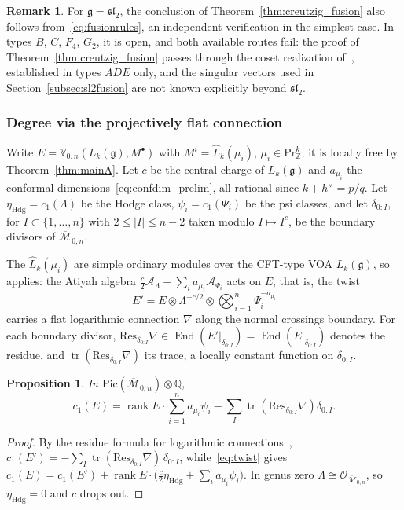 \documentclass[12pt,a4paper,reqno]{amsart}
\numberwithin{equation}{section}
\newtheorem{proposition}[theorem]{Proposition}
\theoremstyle{definition}
\newtheorem{remark}[theorem]{Remark}
\newcommand{\g}{\mathfrak{g}}
\renewcommand{\sl}{\mathfrak{sl}}
\newcommand{\rk}{\operatorname{rank}}
\newcommand{\End}{\operatorname{End}}
\newcommand{\tr}{\operatorname{tr}}
\newcommand{\Z}{\mathbb{Z}}
\newcommand{\Q}{\mathbb{Q}}
\newcommand{\M}{\mathcal{M}}
\def\O{\mathcal{O}}
\def\Pr{\mathrm{Pr}}
\def\o{\otimes}
\def\ds{\dots}
\def\Res{\mathrm{Res}}
\def\VV{\mathbb{V}}
\begin{document}
\begin{remark}\label{rmk:hypF}
For $\g=\sl_2$, the conclusion of Theorem~\ref{thm:creutzig_fusion} also follows from~\eqref{eq:fusionrules}, an independent verification in the simplest case. In types $B$, $C$, $F_4$, $G_2$, it is open, and both available routes fail: the proof of Theorem~\ref{thm:creutzig_fusion} passes through the coset realization of~\cite{ACL19}, established in types $ADE$ only, and the singular vectors used in Section~\ref{subsec:sl2fusion} are not known explicitly beyond $\sl_2$.
\end{remark}

\subsubsection{Degree via the projectively flat connection}\label{subsubsec:degree}

Write $E=\VV_{0,n}(L_k(\g),M^\bullet)$ with $M^i=\hat{L}_k(\mu_i)$, $\mu_i\in\Pr^k_\Z$; it is locally free by Theorem~\ref{thm:mainA}. Let $c$ be the central charge of $L_k(\g)$ and $a_{\mu_i}$ the conformal dimensions~\eqref{eq:confdim_prelim}, all rational since $k+h^\vee=p/q$. Let $\eta_{\mathrm{Hdg}}=c_1(\Lambda)$ be the Hodge class, $\psi_i=c_1(\Psi_i)$ be the psi classes, and let $\delta_{0:I}$, for $I\subset\{1,\ds,n\}$ with $2\leq|I|\leq n-2$ taken modulo $I\mapsto I^c$, be the boundary divisors of $\overline{\M}_{0,n}$.

The $\hat{L}_k(\mu_i)$ are simple ordinary modules over the CFT-type VOA $L_k(\g)$, so~\cite[Theorem 7.1]{DGT1} applies: the Atiyah algebra $\tfrac c2\mathcal{A}_\Lambda+\sum_i a_{\mu_i}\mathcal{A}_{\Psi_i}$ acts on $E$, that is, the twist
\begin{equation}\label{eq:twist}
E'=E\o \Lambda^{-c/2}\o\bigotimes\nolimits_{i=1}^n\Psi_i^{-a_{\mu_i}}
\end{equation}
carries a flat logarithmic connection $\nabla$ along the normal crossings boundary. For each boundary divisor, $\Res_{\delta_{0:I}}\nabla\in\End(E'|_{\delta_{0:I}})=\End(E|_{\delta_{0:I}})$ denotes the residue, and $\tr(\Res_{\delta_{0:I}}\nabla)$ its trace, a locally constant function on $\delta_{0:I}$.

\begin{proposition}\label{prop:c1_shape}
In $\mathrm{Pic}(\overline{\M}_{0,n})\o\Q$,
\begin{equation}\label{eq:c1_shape}
c_1(E)=\rk E\cdot \sum_{i=1}^n a_{\mu_i}\psi_i-\sum_{I} \tr\left(\Res_{\delta_{0:I}}\nabla\right)\delta_{0:I}.
\end{equation}
\end{proposition}
\begin{proof}
By the residue formula for logarithmic connections~\cite[Theorem 3]{Ohtsuki82}, $c_1(E')=-\sum_I\tr(\Res_{\delta_{0:I}}\nabla)\,\delta_{0:I}$, while~\eqref{eq:twist} gives $c_1(E)=c_1(E')+\rk E\cdot\big(\tfrac c2\eta_{\mathrm{Hdg}}+\sum_i a_{\mu_i}\psi_i\big)$. In genus zero $\Lambda\cong\O_{\overline{\M}_{0,n}}$, so $\eta_{\mathrm{Hdg}}=0$ and $c$ drops out. 
\end{proof}
\end{document}
